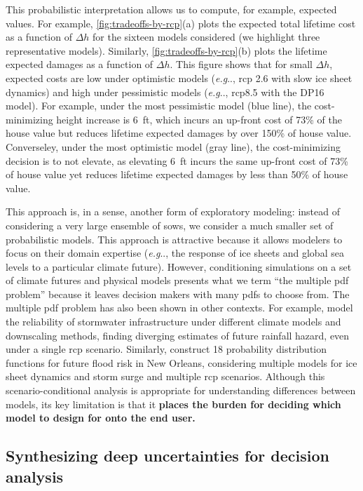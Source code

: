 \documentclass[11pt]{article}
\makeatletter
\DeclareRobustCommand\onedot{\futurelet\@let@token\@onedot}
\def\@onedot{\ifx\@let@token.\else.\null\fi\xspace}
\def\eg{\emph{e.g}\onedot} \def\Eg{\emph{E.g}\onedot}
\DeclareRobustCommand\onedot{\futurelet\@let@token\@onedot}
\def\@onedot{\ifx\@let@token.\else.\null\fi\xspace}
\def\eg{\emph{e.g}\onedot} \def\Eg{\emph{E.g}\onedot}
\makeatother
\begin{document}
This probabilistic interpretation allows us to compute, for example, expected values.
For example, \cref{fig:tradeoffs-by-rcp}(a) plots the expected total lifetime cost as a function of $\Delta h$ for the sixteen models considered (we highlight three representative models).
Similarly, \cref{fig:tradeoffs-by-rcp}(b) plots the lifetime expected damages as a function of $\Delta h$.
This figure shows that for small $\Delta h$, expected costs are low under optimistic models (\eg, \gls{rcp} 2.6 with slow ice sheet dynamics) and high under pessimistic models (\eg, \gls{rcp}8.5 with the DP16 model).
For example, under the most pessimistic model (blue line), the cost-minimizing height increase is \SI{6}{ft}, which incurs an up-front cost of 73\% of the house value but reduces lifetime expected damages by over 150\% of house value.
Converseley, under the most optimistic model (gray line), the cost-minimizing decision is to not elevate, as elevating \SI{6}{ft} incurs the same up-front cost of 73\% of house value yet reduces lifetime expected damages by less than 50\% of house value.

This approach is, in a sense, another form of exploratory modeling: instead of considering a very large ensemble of \glspl{sow}, we consider a much smaller set of probabilistic models.
This approach is attractive because it allows modelers to focus on their domain expertise (\eg, the response of ice sheets and global sea levels to a particular climate future).
However, conditioning simulations on a set of climate futures and physical models presents what we term ``the multiple \gls{pdf} problem'' because it leaves decision makers with many \glspl{pdf} to choose from.
The multiple \gls{pdf} problem has also been shown in other contexts.
For example, \citet{sharma_rcp:2021} model the reliability of stormwater infrastructure under different climate models and downscaling methods, finding diverging estimates of future rainfall hazard, even under a single \gls{rcp} scenario.
Similarly, \citet{wong_nola:2017} construct 18 probability distribution functions for future flood risk in New Orleans, considering multiple models for ice sheet dynamics and storm surge and multiple \gls{rcp} scenarios.
Although this scenario-conditional analysis is appropriate for understanding differences between models, its key limitation is that it \textbf{places the burden for deciding which model to design for onto the end user.}

\subsection{Synthesizing deep uncertainties for decision analysis}\label{sec:results-synthesis}
\end{document}
